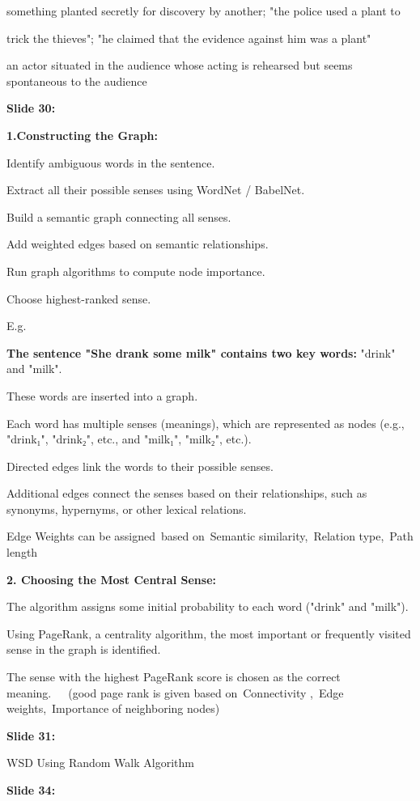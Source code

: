 \documentclass[11pt,a4paper]{article}
\begin{document}
something planted secretly for discovery by another; "the police used a plant to

trick the thieves"; "he claimed that the evidence against him was a plant"

an actor situated in the audience whose acting is rehearsed but seems  spontaneous to the audience

\textbf{Slide 30:}

\textbf{1.Constructing the Graph:} 

Identify ambiguous words in the sentence.

Extract all their possible senses using WordNet / BabelNet.

Build a semantic graph connecting all senses.

Add weighted edges based on semantic relationships.

Run graph algorithms to compute node importance.

Choose highest-ranked sense.

E.g.

\textbf{The sentence "She drank some milk" contains two key words:}  "drink" and "milk".

These words are inserted into a graph.

Each word has multiple senses (meanings), which are represented as nodes (e.g., "drink₁", "drink₂", etc., and "milk₁", "milk₂", etc.).

Directed edges link the words to their possible senses.

Additional edges connect the senses based on their relationships, such as synonyms, hypernyms, or other lexical relations.

Edge Weights can be assigned based on Semantic similarity, Relation type, Path length

\textbf{2. Choosing the Most Central Sense:} 

The algorithm assigns some initial probability to each word ("drink" and "milk").

Using PageRank, a centrality algorithm, the most important or frequently visited sense in the graph is identified.

The sense with the highest PageRank score is chosen as the correct meaning.   (good page rank is given based on Connectivity , Edge weights, Importance of neighboring nodes)

\textbf{Slide 31:}

WSD Using Random Walk Algorithm

\textbf{Slide 34:}
\end{document}
